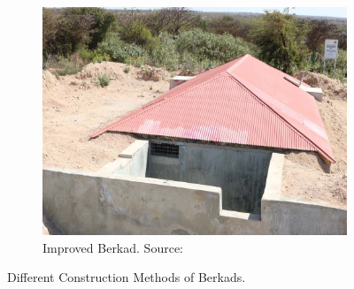 \begin{figure}[!hbp]
\begin{subfigure}[t]{0.3\linewidth}
        \centering\includegraphics[width=0.95\linewidth]{figures/2023_MA_th_berkad_improved.png}
        \caption{Improved Berkad. Source: \textcite{thepharofoundationImprovedBerkad2020}}
    \end{subfigure}
        \caption{Different Construction Methods of Berkads.}
        \label{fig:th_berkads}
\end{figure}


